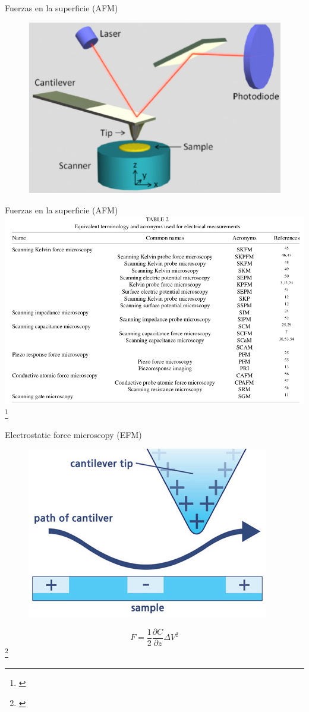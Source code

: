 \documentclass[handout]{beamer}
\newcommand\blfootnote[1]
{%
	\begingroup
	\renewcommand\thefootnote{}\footnote{#1}%
	\addtocounter{footnote}{-1}%
	\endgroup
}
\newcommand{\fcite}[1]{\blfootnote{\cite{#1}}}
\begin{document}
\begin{frame}{Fuerzas en la superficie (AFM)}
	\begin{figure}[h]
		\centering
		\includegraphics[width=0.7\linewidth]{sources/afmb}
	\end{figure}
\end{frame}

\begin{frame}{Fuerzas en la superficie (AFM)}
	\includegraphics[width=0.9\linewidth]{sources/afm1}
	\fcite{avila2010electrical}
\end{frame}

\begin{frame}{Electrostatic force microscopy (EFM)}
	\begin{figure}[h]
		\centering
		\includegraphics[width=0.7\linewidth]{sources/efm}
	\end{figure}
	\begin{equation}
		F = \dfrac{1}{2}\dfrac{\partial C}{\partial z}\Delta V^2
	\end{equation}
	\fcite{avila2010electrical}
\end{frame}



\end{document}
